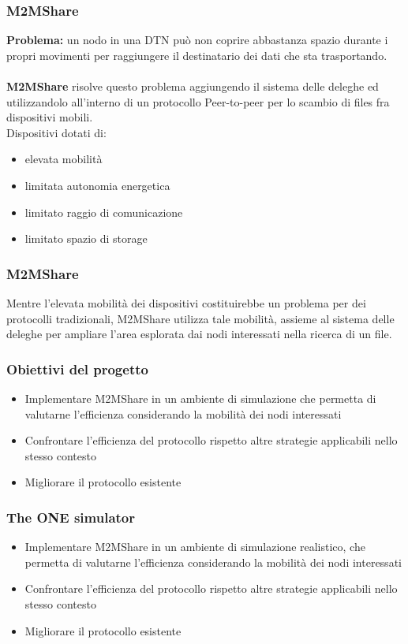 \documentclass{beamer}
\begin{document}
\begin{frame}
\frametitle{M2MShare}
\textbf{Problema: } un nodo in una DTN può non coprire abbastanza spazio durante i propri movimenti per raggiungere il destinatario dei dati che sta trasportando.
\ \\
\ \\
\pause 
\textbf{M2MShare} risolve questo problema aggiungendo il sistema delle deleghe ed utilizzandolo all'interno di un protocollo Peer-to-peer per lo scambio di files fra dispositivi mobili.
\\
\pause 
Dispositivi dotati di:
\begin{itemize}
\item elevata mobilità
\item limitata autonomia energetica
\item limitato raggio di comunicazione
\item limitato spazio di storage
\end{itemize}
\end{frame}

\begin{frame}
\frametitle{M2MShare}
Mentre l'elevata mobilità dei dispositivi costituirebbe un problema per dei protocolli tradizionali, M2MShare utilizza tale mobilità, assieme al sistema delle deleghe per ampliare l'area esplorata dai nodi interessati nella ricerca di un file.
\end{frame}

\begin{frame}
\frametitle{Obiettivi del progetto}
\begin{itemize}
\item Implementare M2MShare in un ambiente di simulazione che permetta di valutarne l'efficienza considerando la mobilità dei nodi interessati
\item Confrontare l'efficienza del protocollo rispetto altre strategie applicabili nello stesso contesto
\item Migliorare il protocollo esistente 
\end{itemize}
\end{frame}

\begin{frame}
\frametitle{The ONE simulator}
\begin{itemize}
\item Implementare M2MShare in un ambiente di simulazione realistico, che permetta di valutarne l'efficienza considerando la mobilità dei nodi interessati
\item Confrontare l'efficienza del protocollo rispetto altre strategie applicabili nello stesso contesto
\item Migliorare il protocollo esistente 
\end{itemize}
\end{frame}
\end{document}
